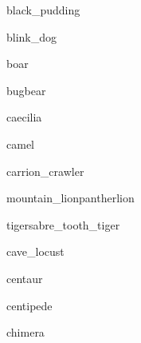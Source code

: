 \documentclass[a4paper,serif]{module}
\begin{document}
\begin{newmonster}{black_pudding}\end{newmonster}

\begin{newmonster}{blink_dog}\end{newmonster}

\begin{newmonster}{boar}\end{newmonster}

\begin{newmonster}{bugbear}\end{newmonster}

\begin{newmonster}{caecilia}\end{newmonster}

\begin{newmonster}{camel}\end{newmonster}

\begin{newmonster}{carrion_crawler}\end{newmonster}


\begin{newmonster3}{mountain_lion}{panther}{lion}\end{newmonster3}
\begin{newmonster2*}{tiger}{sabre_tooth_tiger}{}{}\lipsum[4]\end{newmonster2*}

\begin{newmonster}{cave_locust}\end{newmonster}

\begin{newmonster}{centaur}\end{newmonster}

\begin{newmonster}{centipede}\end{newmonster}

\begin{newmonster}{chimera}\end{newmonster}
\end{document}
